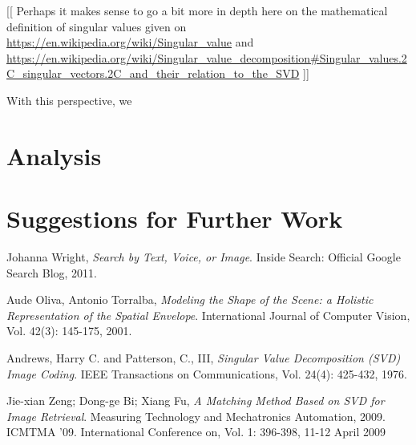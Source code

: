 \documentclass{report}
\begin{document}
[[ Perhaps it makes sense to go a bit more in depth here on the mathematical definition of singular values given on \url{https://en.wikipedia.org/wiki/Singular_value} and \url{https://en.wikipedia.org/wiki/Singular_value_decomposition#Singular_values.2C_singular_vectors.2C_and_their_relation_to_the_SVD}
]]

With this perspective, we 

\chapter{Analysis}

\chapter{Suggestions for Further Work}


\begin{thebibliography}{9}

  Johanna Wright,
  \emph{Search by Text, Voice, or Image}.
  Inside Search: Official Google Search Blog,
  2011.
  
  Aude Oliva, Antonio Torralba,
  \emph{	Modeling the Shape of the Scene: a Holistic Representation of the Spatial Envelope}.
  International Journal of Computer Vision, 
  Vol. 42(3): 145-175, 
  2001.
 
  Andrews, Harry C. and Patterson, C., III,
  \emph{ Singular Value Decomposition (SVD) Image Coding}.
  IEEE Transactions on Communications,
  Vol. 24(4): 425-432,
  1976.

  Jie-xian Zeng; Dong-ge Bi; Xiang Fu,
  \emph{A Matching Method Based on SVD for Image Retrieval}.
  Measuring Technology and Mechatronics Automation, 2009. ICMTMA '09. International Conference on, 
  Vol. 1: 396-398, 
  11-12 April 2009

\end{thebibliography}
\end{document}
